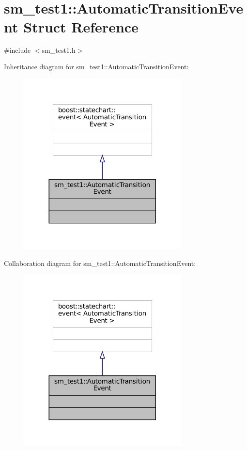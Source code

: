 \hypertarget{structsm__test1_1_1AutomaticTransitionEvent}{}\section{sm\+\_\+test1\+:\+:Automatic\+Transition\+Event Struct Reference}
\label{structsm__test1_1_1AutomaticTransitionEvent}


{\ttfamily \#include $<$sm\+\_\+test1.\+h$>$}



Inheritance diagram for sm\+\_\+test1\+:\+:Automatic\+Transition\+Event\+:
\nopagebreak
\begin{figure}[H]
\begin{center}
\leavevmode
\includegraphics[width=245pt]{structsm__test1_1_1AutomaticTransitionEvent__inherit__graph}
\end{center}
\end{figure}


Collaboration diagram for sm\+\_\+test1\+:\+:Automatic\+Transition\+Event\+:
\nopagebreak
\begin{figure}[H]
\begin{center}
\leavevmode
\includegraphics[width=245pt]{structsm__test1_1_1AutomaticTransitionEvent__coll__graph}
\end{center}
\end{figure}


